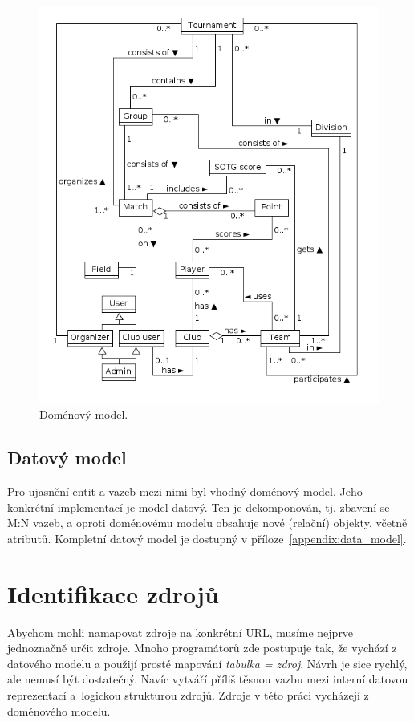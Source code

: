 \begin{figure}[ht!]
\centering
\includegraphics[width=130mm]{./images/domenovy-model.png}
\caption{Doménový model.\label{overflow}}
\label{fig:domain_model}
\end{figure}

\subsection{Datový model}

Pro ujasnění entit a vazeb mezi nimi byl vhodný doménový model. Jeho konkrétní implementací je model datový.
Ten je dekomponován, tj. zbavení se M:N vazeb, a oproti doménovému modelu obsahuje nové
(relační) objekty, včetně atributů. Kompletní datový model je dostupný v příloze~\ref{appendix:data_model}.

\section{Identifikace zdrojů}


Abychom mohli namapovat zdroje na konkrétní URL, musíme nejprve jednoznačně určit zdroje.
Mnoho programátorů zde postupuje tak, že vychází z datového modelu a použijí prosté mapování \textit{tabulka = zdroj}.
Návrh je sice rychlý, ale nemusí být dostatečný. Navíc vytváří příliš těsnou vazbu mezi interní datovou reprezentací
a~logickou strukturou zdrojů. Zdroje v této práci vycházejí z doménového modelu.

